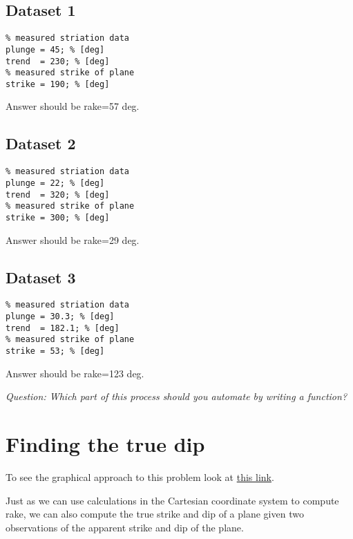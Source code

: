 \documentclass[10pt,fleqn]{article}
\begin{document}
\begin{multicols}{3}
\subsection*{Dataset 1}

\begin{lstlisting}
% measured striation data
plunge = 45; % [deg]
trend  = 230; % [deg]
% measured strike of plane
strike = 190; % [deg]
\end{lstlisting}

Answer should be rake=57 deg.

\subsection*{Dataset 2}

\begin{lstlisting}
% measured striation data
plunge = 22; % [deg]
trend  = 320; % [deg]
% measured strike of plane
strike = 300; % [deg]
\end{lstlisting}

Answer should be rake=29 deg.

\subsection*{Dataset 3}

\begin{lstlisting}
% measured striation data
plunge = 30.3; % [deg]
trend  = 182.1; % [deg]
% measured strike of plane
strike = 53; % [deg]
\end{lstlisting}

Answer should be rake=123 deg.
\end{multicols}

\textit{Question: Which part of this process should you automate by writing a function?}

\pagebreak

\section*{Finding the true dip}

To see the graphical approach to this problem look at \href{https://www.uwgb.edu/dutchs/structge/SL83Plane2AD.HTM}{this link}.

Just as we can use calculations in the Cartesian coordinate system to compute rake, we can also compute the true strike and dip of a plane given two observations of the apparent strike and dip of the plane.
\end{document}
